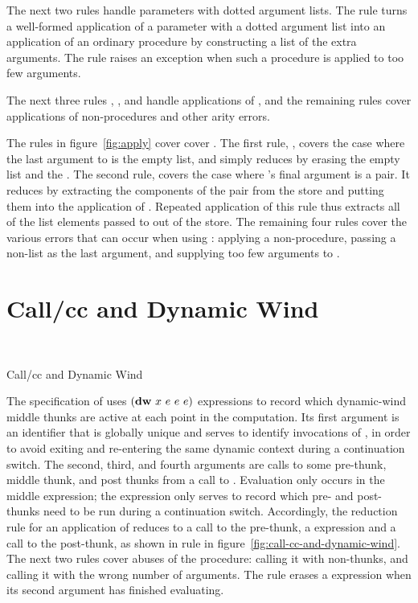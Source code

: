 The next two rules handle parameters with dotted argument lists. The
rule  turns a well-formed application of a
parameter with a dotted argument list into an application of an
ordinary procedure by constructing a list of the extra arguments. The
 rule raises an exception when such a procedure
is applied to too few arguments.

The next three rules , , and
 handle applications of , and the
remaining rules cover applications of non-procedures and other arity
errors.

The rules in figure~\ref{fig:apply} cover 
cover . The first
rule, , covers the case where the last argument to
 is the empty list, and simply reduces by erasing the
empty list and the . The second rule, 
covers the case where 's final argument is a pair. It
reduces by extracting the components of the pair from the store and
putting them into the application of . Repeated
application of this rule thus extracts all of the list elements passed
to  out of the store. The remaining four rules cover the
various errors that can occur when using : applying a
non-procedure, passing a non-list as the last argument, and supplying
too few arguments to .

\section{Call/cc and Dynamic Wind}

\beginfig
\begin{center}
 \\

\end{center}
\caption{Call/cc and Dynamic Wind}\label{fig:call-cc-and-dynamic-wind}
\endfig

The specification of  uses $(\textnormal{\textbf{dw}}~x~e~e~e)$
expressions to record which dynamic-wind middle thunks are active at
each point in the computation. Its first argument is an identifier
that is globally unique and serves to identify invocations of
, in order to avoid exiting and re-entering the
same dynamic context during a continuation switch. The second, third,
and fourth arguments are calls to some pre-thunk, middle thunk, and
post thunks from a call to . Evaluation only
occurs in the middle expression; the  expression only
serves to record which pre- and post- thunks need to be run during a
continuation switch. Accordingly, the reduction rule for an
application of  reduces to a call to the
pre-thunk, a  expression and a call to the post-thunk, as
shown in rule  in
figure~\ref{fig:call-cc-and-dynamic-wind}. The next two rules cover
abuses of the  procedure: calling it with
non-thunks, and calling it with the wrong number of arguments. The
 rule erases a  expression when its second
argument has finished evaluating.

